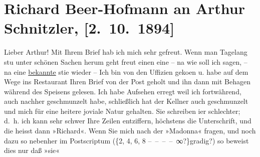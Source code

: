 

               \section[Richard Beer-Hofmann an Arthur Schnitzler, {[}2. 10. 1894{]}]{ Richard Beer-Hofmann an Arthur Schnitzler, {[}2. 10. 1894{]}}\nopagebreak{}\rehead{ }\begin{ledgroupsized}[t]{13cm}\normalsize\beginnumbering{} \toendnotes[C]{\smallbreak\pagebreak[2]} 
\toendnotes[C]{\smallbreak}\pstart
           \noindent{}{\pb}Lieber Arthur! Mit Ihrem Brief hab ich mich sehr gefreut. Wenn
                    man Tagelang stu{\geminationm} unter schönen Sachen herum geht
                    freut einen eine – na wie soll ich sagen, – na eine \uline{bekannte} sti{\geminationm}e wieder –\pend
           \pstart
           Ich bin von den Uffizien geko{\geminationm}en u. habe auf dem Wege ins Restaurant {\pb}Ihren Brief von der Post
                    geholt und ihn dann mit Behagen während des Speisens gelesen. Ich habe Aufsehen
                    erregt weil ich fortwährend, auch nachher geschmunzelt habe, schließlich hat der
                    Kellner auch geschmunzelt und mich für eine heitere joviale Natur gehalten.\pend
           \pstart
           Sie schreiben i{\geminationm}er schlechter; d. h. ich kann sehr
                    schwer {\pb}Ihre Zeilen
                    entziffern, höchstens die Unterschrift, und die heisst dann »Richard«. Wenn Sie
                    mich nach der
                    »Madonna«
                    fragen, und noch dazu so nebenher im Postscriptum ({\{}2, 4, 6, 8 – – – – ∞?{\}}gradig?) so beweist dies nur daß »sie«

\end{ledgroupsized}
